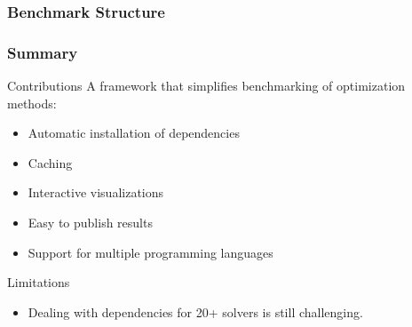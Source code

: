 \documentclass[10pt]{beamer}
\begin{document}
%
%

\begin{frame}[fragile]
  \frametitle{Benchmark Structure}


\end{frame}

\begin{frame}
  \frametitle{Summary}

  \begin{exampleblock}{Contributions}
    A framework that simplifies benchmarking of optimization methods:
    \begin{itemize}
      \item Automatic installation of dependencies
      \item Caching
      \item Interactive visualizations
      \item Easy to publish results
      \item Support for multiple programming languages
    \end{itemize}
  \end{exampleblock}

  \pause

  \begin{alertblock}{Limitations}
    \begin{itemize}
      \item Dealing with dependencies for 20+ solvers is still challenging.
    \end{itemize}
  \end{alertblock}
\end{frame}
\end{document}
